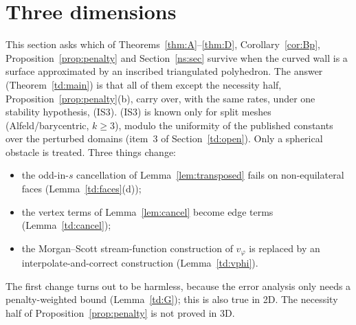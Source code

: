 \section{Three dimensions}\label{td:sec}

This section asks which of Theorems~\ref{thm:A}--\ref{thm:D}, Corollary~\ref{cor:Bp}, Proposition~\ref{prop:penalty} and Section~\ref{ns:sec} survive when the curved wall is a surface approximated by an inscribed triangulated polyhedron. The answer (Theorem~\ref{td:main}) is that all of them except the necessity half, Proposition~\ref{prop:penalty}(b), carry over, with the same rates, under one stability hypothesis, (IS3). (IS3) is known only for split meshes (Alfeld/barycentric, $k\ge3$), modulo the uniformity of the published constants over the perturbed domains (item~3 of Section~\ref{td:open}). Only a spherical obstacle is treated. Three things change:
\begin{itemize}
\item the odd-in-$s$ cancellation of Lemma~\ref{lem:transposed} fails on non-equilateral faces (Lemma~\ref{td:faces}(d));
\item the vertex terms of Lemma~\ref{lem:cancel} become edge terms (Lemma~\ref{td:cancel});
\item the Morgan--Scott stream-function construction of $v_\varphi$ is replaced by an interpolate-and-correct construction (Lemma~\ref{td:vphi}).
\end{itemize}
The first change turns out to be harmless, because the error analysis only needs a penalty-weighted bound (Lemma~\ref{td:G}); this is also true in 2D. The necessity half of Proposition~\ref{prop:penalty} is not proved in 3D.

